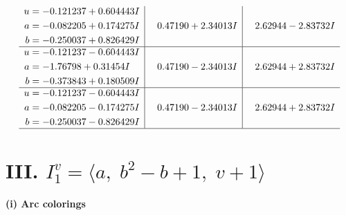 \documentclass[1p]{elsarticle_modified}
\theoremstyle{definition}
\begin{document}
$$\begin{array}{c|c|c}
\begin{aligned}
u &= -0.121237 + 0.604443 I \\
a &= -0.082205 + 0.174275 I \\
b &= -0.250037 + 0.826429 I\end{aligned}
 & \phantom{-}0.47190 + 2.34013 I & \phantom{-}2.62944 - 2.83732 I \\ \hline\begin{aligned}
u &= -0.121237 - 0.604443 I \\
a &= -1.76798 + 0.31454 I \\
b &= -0.373843 + 0.180509 I\end{aligned}
 & \phantom{-}0.47190 - 2.34013 I & \phantom{-}2.62944 + 2.83732 I \\ \hline\begin{aligned}
u &= -0.121237 - 0.604443 I \\
a &= -0.082205 - 0.174275 I \\
b &= -0.250037 - 0.826429 I\end{aligned}
 & \phantom{-}0.47190 - 2.34013 I & \phantom{-}2.62944 + 2.83732 I\\
 \hline 
 \end{array}$$\newpage\newpage\renewcommand{\arraystretch}{1}
\centering \section*{III. $I^v_{1}= \langle a,\;b^2- b+1,\;v+1 \rangle$}
\flushleft \textbf{(i) Arc colorings}\\
\end{document}
